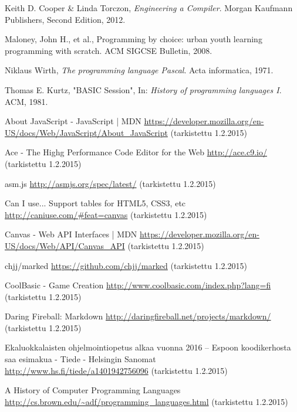 
\begin{thebibliography}{99}

	Keith D. Cooper \& Linda Torczon,
	\emph{Engineering a Compiler}.
	Morgan Kaufmann Publishers,
	Second Edition,
	2012.

	Maloney, John H., et al.,
	Programming by choice: urban youth learning programming with scratch.
	ACM SIGCSE Bulletin,
	2008.
	
	Niklaus Wirth,
	\emph{The programming language Pascal}.
	Acta informatica,
	1971.

	Thomas E. Kurtz,
	"BASIC Session",
	In: \emph{History of programming languages I}.
	ACM,
	1981.

	
	About JavaScript - JavaScript | MDN \url{https://developer.mozilla.org/en-US/docs/Web/JavaScript/About_JavaScript} (tarkistettu 1.2.2015)
	
	Ace - The Highg Performance Code Editor for the Web \url{http://ace.c9.io/} (tarkistettu 1.2.2015)

	asm.js \url{http://asmjs.org/spec/latest/} (tarkistettu 1.2.2015)
	
	Can I use... Support tables for HTML5, CSS3, etc \url{http://caniuse.com/#feat=canvas} (tarkistettu 1.2.2015)
	
	Canvas - Web API Interfaces | MDN \url{https://developer.mozilla.org/en-US/docs/Web/API/Canvas_API} (tarkistettu 1.2.2015)

	chjj/marked \url{https://github.com/chjj/marked} (tarkistettu 1.2.2015)
	
	CoolBasic - Game Creation \url{http://www.coolbasic.com/index.php?lang=fi} (tarkistettu 1.2.2015)

	Daring Fireball: Markdown \url{http://daringfireball.net/projects/markdown/} (tarkistettu 1.2.2015)
	
	Ekaluokkalaisten ohjelmointiopetus alkaa vuonna 2016 – Espoon koodikerhosta saa esimakua - Tiede - Helsingin Sanomat \url{http://www.hs.fi/tiede/a1401942756096} (tarkistettu 1.2.2015)
	
	A History of Computer Programming Languages \url{http://cs.brown.edu/~adf/programming_languages.html} (tarkistettu 1.2.2015)
	

\end{thebibliography}
